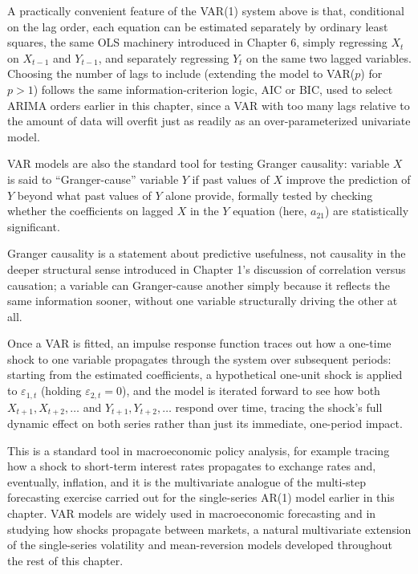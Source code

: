 \documentclass[../ai_in_finance]{subfiles}
\begin{document}
A practically convenient feature of the VAR(1) system above is that, conditional on the lag order, each equation can be estimated separately by ordinary least squares, the same OLS machinery introduced in Chapter 6, simply regressing $X_t$ on $X_{t-1}$ and $Y_{t-1}$, and separately regressing $Y_t$ on the same two lagged variables. Choosing the number of lags to include (extending the model to VAR($p$) for $p>1$) follows the same information-criterion logic, AIC or BIC, used to select ARIMA orders earlier in this chapter, since a VAR with too many lags relative to the amount of data will overfit just as readily as an over-parameterized univariate model.

VAR models are also the standard tool for testing Granger causality: variable $X$ is said to ``Granger-cause'' variable $Y$ if past values of $X$ improve the prediction of $Y$ beyond what past values of $Y$ alone provide, formally tested by checking whether the coefficients on lagged $X$ in the $Y$ equation (here, $a_{21}$) are statistically significant.

Granger causality is a statement about predictive usefulness, not causality in the deeper structural sense introduced in Chapter 1's discussion of correlation versus causation; a variable can Granger-cause another simply because it reflects the same information sooner, without one variable structurally driving the other at all.

Once a VAR is fitted, an impulse response function traces out how a one-time shock to one variable propagates through the system over subsequent periods: starting from the estimated coefficients, a hypothetical one-unit shock is applied to $\varepsilon_{1,t}$ (holding $\varepsilon_{2,t}=0$), and the model is iterated forward to see how both $X_{t+1}, X_{t+2}, \ldots$ and $Y_{t+1}, Y_{t+2}, \ldots$ respond over time, tracing the shock's full dynamic effect on both series rather than just its immediate, one-period impact.

This is a standard tool in macroeconomic policy analysis, for example tracing how a shock to short-term interest rates propagates to exchange rates and, eventually, inflation, and it is the multivariate analogue of the multi-step forecasting exercise carried out for the single-series AR(1) model earlier in this chapter. VAR models are widely used in macroeconomic forecasting and in studying how shocks propagate between markets, a natural multivariate extension of the single-series volatility and mean-reversion models developed throughout the rest of this chapter.
\end{document}
